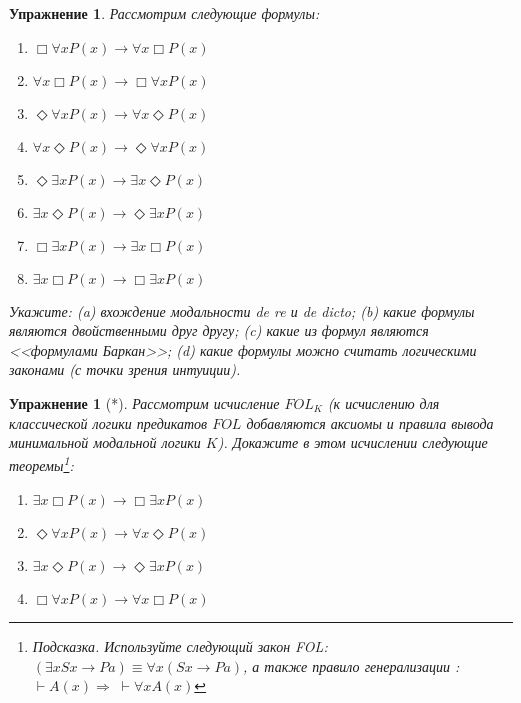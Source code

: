 \documentclass[11pt]{article}
\newtheorem{exercise}[theorem]{Упражнение}
\begin{document}
\begin{exercise} Рассмотрим следующие формулы:
\begin{multicols}{2}
\begin{enumerate}
\item $ \Box \forall x P(x) \to \forall x \Box P(x)$ 
\item $ \forall x \Box P(x) \to \Box \forall x P(x)$ 
\item $ \Diamond \forall x P(x) \to \forall x \Diamond P(x)$ 
\item $ \forall x \Diamond P(x) \to \Diamond  \forall x P(x)$ 
\item $ \Diamond \exists x P(x) \to \exists x \Diamond P(x)$	
\item $ \exists x \Diamond P(x) \to \Diamond \exists x P(x)$
\item $ \Box \exists x P(x) \to \exists x \Box P(x)$	
\item $ \exists x \Box P(x) \to  \Box \exists x P(x)$ 	
\end{enumerate}
\end{multicols}

Укажите: (a) вхождение модальности de re и de dicto; (b) какие формулы являются двойственными друг другу; (c) какие из формул являются <<формулами Баркан>>; (d) какие формулы можно считать логическими законами (с точки зрения интуиции).
\end{exercise}

\begin{exercise}[*] Рассмотрим исчисление $FOL_{K}$ (к исчислению для классической логики предикатов $FOL$ добавляются аксиомы и правила вывода минимальной модальной логики $K$). Докажите в этом исчислении следующие теоремы\footnote{Подсказка. Используйте следующий закон FOL: $(\exists x Sx \to Pa) \equiv \forall x (Sx \to Pa)$, а также правило генерализации : $\vdash A(x) \Rightarrow \; \vdash \forall x A(x)$}:
\begin{multicols}{2}
\begin{enumerate}
    \item $\exists x \Box P(x) \to \Box \exists x P(x)$
    \item $\Diamond \forall x  P(x) \to \forall x \Diamond P(x)$
    \item $\exists x \Diamond P(x) \to \Diamond  \exists x P(x)$
    \item $\Box \forall x  P(x) \to \forall x \Box P(x)$
\end{enumerate}
\end{multicols}
\end{exercise}
\end{document}
